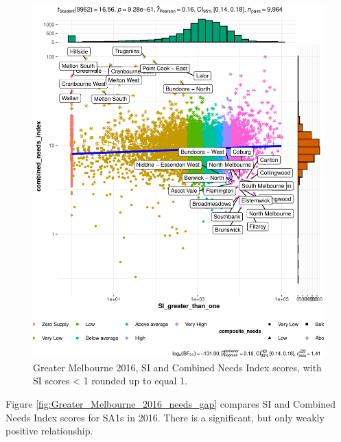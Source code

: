 \documentclass[preprint, 3p,
authoryear]{elsarticle} %
\begin{document}
\begin{figure}
\centering
\includegraphics{Leveraging_GTFS_to_assess_transit_supply_Transport_Geography_files/figure-latex/Greater_Melbourne_2016_needs_gap-1.pdf}
\caption{Greater Melbourne 2016, SI and Combined Needs Index scores,
with SI scores \textless{} 1 rounded up to equal 1.}
\end{figure}

Figure \ref{fig:Greater_Melbourne_2016_needs_gap} compares SI and
Combined Needs Index scores for SA1s in 2016. There is a significant,
but only weakly positive relationship.

\begingroup\fontsize{7}{9}\selectfont
\end{document}

